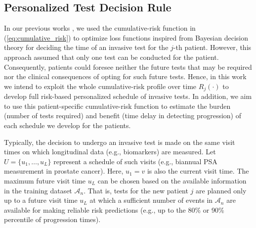 \documentclass[AMA,STIX1COL]{WileyNJD-v2}
\begin{document}
\subsection{Personalized Test Decision Rule} 
\label{subsec:pers_schedule}
In our previous works \citep{tomer2019personalizedbiometrics,tomer2019personalized}, we used the cumulative-risk function in (\ref{eq:cumulative_risk}) to optimize loss functions inspired from Bayesian decision theory for deciding the time of an invasive test for the $j$-th patient. However, this approach assumed that only one test can be conducted for the patient. Consequently, patients could foresee neither the future tests that may be required nor the clinical consequences of opting for such future tests. Hence, in this work we intend to exploit the whole cumulative-risk profile over time $R_j(\cdot)$ to develop full risk-based personalized schedule of invasive tests. In addition, we aim to use this patient-specific cumulative-risk function to estimate the burden (number of tests required) and benefit (time delay in detecting progression) of each schedule we develop for the patients.

Typically, the decision to undergo an invasive test is made on the same visit times on which longitudinal data (e.g., biomarkers) are measured. Let $U = \{u_1, \ldots, u_L\}$ represent a schedule of such visits (e.g., biannual PSA measurement in prostate cancer).  Here, $u_1 = v$ is also the current visit time. The maximum future visit time $u_L$ can be chosen based on the available information in the training dataset $\mathcal A_n$. That is, tests for the new patient $j$ are planned only up to a future visit time $u_L$ at which a sufficient number of events in $\mathcal A_n$ are available for making reliable risk predictions (e.g., up to the 80\% or 90\% percentile of progression times).
\end{document}
